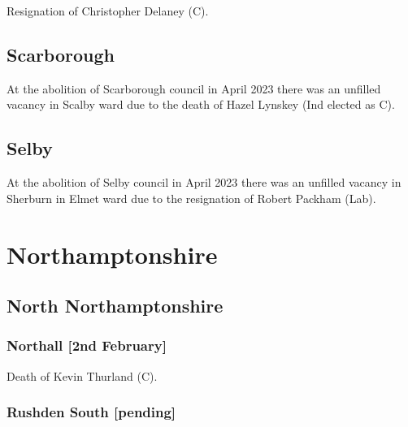 \documentclass[a4paper,openany]{book}
\begin{document}
\begin{resultsiii}

Resignation of Christopher Delaney (C).

\subsection*{Scarborough}

At the abolition of Scarborough council in April 2023 there was an unfilled vacancy in Scalby ward due to the death of Hazel Lynskey (Ind elected as C).%

\subsection*{Selby}

At the abolition of Selby council in April 2023 there was an unfilled vacancy in Sherburn in Elmet ward due to the resignation of Robert Packham (Lab).%

\section{Northamptonshire}

\subsection*{North Northamptonshire}

\subsubsection*{Northall \hspace*{\fill}\nolinebreak[1]%
	\enspace\hspace*{\fill}
	[2nd February]}


Death of Kevin Thurland (C).

\subsubsection*{Rushden South \hspace*{\fill}\nolinebreak[1]%
	\enspace\hspace*{\fill}
	[pending]}


\end{resultsiii}
\end{document}
